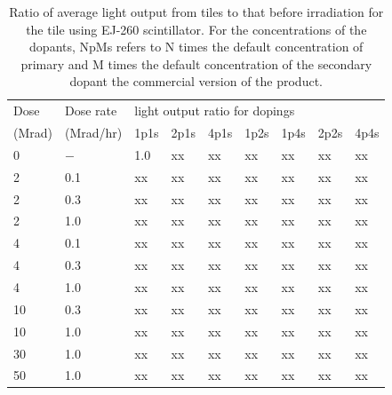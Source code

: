 \documentclass[review]{elsarticle}
\begin{document}
\begin{table}[thb]
\centering
\caption{
Ratio of average light output from tiles to that before irradiation
for the tile using EJ-260 scintillator.  For the concentrations
of the dopants, NpMs refers to N times the default concentration of primary and M times the default concentration of the secondary dopant
the commercial version of the product.
}
\label{tab:ResultsEJ260}
{\small
\begin{tabular}{|l| l| l| l| l| l| l| l| l|}
\hline
Dose & Dose rate  &\multicolumn{7}{|l|}{light output ratio for dopings} \\
(Mrad)  & (Mrad/hr) & 1p1s & 2p1s & 4p1s & 1p2s & 1p4s & 2p2s & 4p4s   \\
\hline
\hline
0 & $-$ & 1.0 & {\color{red} xx} & {\color{red} xx} & {\color{red} xx}& {\color{red} xx} & {\color{red} xx} & {\color{red} xx}\\ \hline
2 & 0.1 & {\color{red} xx} & {\color{red} xx} & {\color{red} xx} & {\color{red} xx}& {\color{red} xx} & {\color{red} xx} & {\color{red} xx}\\
2 & 0.3 & {\color{red} xx} & {\color{red} xx} & {\color{red} xx} & {\color{red} xx}& {\color{red} xx} & {\color{red} xx} & {\color{red} xx}\\
2 & 1.0 & {\color{red} xx} & {\color{red} xx} & {\color{red} xx} & {\color{red} xx}& {\color{red} xx} & {\color{red} xx} & {\color{red} xx}\\ \hline
4 & 0.1 & {\color{red} xx} & {\color{red} xx} & {\color{red} xx} & {\color{red} xx}& {\color{red} xx} & {\color{red} xx} & {\color{red} xx}\\
4 & 0.3 & {\color{red} xx} & {\color{red} xx} & {\color{red} xx} & {\color{red} xx} & {\color{red} xx} & {\color{red} xx} & {\color{red} xx}\\ 
4 & 1.0 & {\color{red} xx} & {\color{red} xx} & {\color{red} xx} & {\color{red} xx}& {\color{red} xx} & {\color{red} xx} & {\color{red} xx}\\ \hline
10 & 0.3 & {\color{red} xx} & {\color{red} xx} & {\color{red} xx} & {\color{red} xx}& {\color{red} xx} & {\color{red} xx} & {\color{red} xx}\\
10 & 1.0 & {\color{red} xx} & {\color{red} xx} & {\color{red} xx} & {\color{red} xx}& {\color{red} xx} & {\color{red} xx} & {\color{red} xx}\\ \hline
30 & 1.0 & {\color{red} xx} & {\color{red} xx} & {\color{red} xx} & {\color{red} xx}& {\color{red} xx} & {\color{red} xx} & {\color{red} xx}\\ \hline
50 & 1.0 & {\color{red} xx} & {\color{red} xx} & {\color{red} xx} & {\color{red} xx}& {\color{red} xx} & {\color{red} xx} & {\color{red} xx}\\ \hline
\hline
\end{tabular}
}
\end{table}
\end{document}
